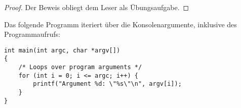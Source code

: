 \documentclass[numbers=endperiod]{scrartcl}
\begin{document}
\begin{theorem}

\end{theorem}
\begin{proof}
Der Beweis obliegt dem Leser als Übungsaufgabe.
\end{proof}

\begin{exercise}
Das folgende Programm iteriert über die Konsolenargumente, inklusive des
Programmaufrufs:
\begin{lstlisting}[style=default]
int main(int argc, char *argv[])
{
	/* Loops over program arguments */
	for (int i = 0; i <= argc; i++) {
		printf("Argument %d: \"%s\"\n", argv[i]);
	}
}
\end{lstlisting}
\end{exercise}


\begin{appendix}
\printbibliography
\end{appendix}
\end{document}

